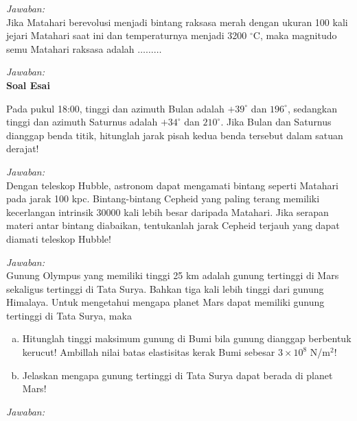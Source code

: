 \documentclass[11pt,fleqn, a4paper]{exam}
\begin{document}
\begin{questions}
\textit{Jawaban: }\\


\vspace{0.5cm}
\question Jika Matahari berevolusi menjadi bintang raksasa merah dengan ukuran 100 kali jejari Matahari saat ini dan temperaturnya menjadi 3200 $^{\circ}$C, maka magnitudo semu Matahari raksasa adalah $\ldots\ldots\ldots$

\textit{Jawaban: }\\


\vspace{1cm}
\textbf{Soal Esai}

\vspace{0.5cm}
\question Pada pukul 18:00, tinggi dan azimuth Bulan adalah $+39^{\circ}$ dan $196^{\circ}$, sedangkan tinggi dan azimuth Saturnus adalah $+34^{\circ}$ dan $210^{\circ}$. Jika Bulan dan Saturnus dianggap benda titik, hitunglah jarak pisah kedua benda tersebut dalam satuan derajat!  

\textit{Jawaban: }\\


\vspace{0.5cm}
\question Dengan teleskop Hubble, astronom dapat mengamati bintang seperti Matahari pada jarak 100 kpc. Bintang-bintang Cepheid yang paling terang memiliki kecerlangan intrinsik 30000 kali lebih besar daripada Matahari. Jika serapan materi antar bintang diabaikan, tentukanlah jarak Cepheid terjauh yang dapat diamati teleskop Hubble!

\textit{Jawaban: }\\


\vspace{0.5cm}
\question Gunung Olympus yang memiliki tinggi 25 km adalah gunung tertinggi di Mars sekaligus tertinggi di Tata Surya. Bahkan tiga kali lebih tinggi dari gunung Himalaya. Untuk mengetahui mengapa planet Mars dapat memiliki gunung tertinggi di Tata Surya, maka
\begin{enumerate}[(a)]
\item Hitunglah tinggi maksimum gunung di Bumi bila gunung dianggap berbentuk kerucut! Ambillah nilai batas elastisitas kerak Bumi sebesar $3 \times 10^8$ N/m$^{2}$!
\item Jelaskan mengapa gunung tertinggi di Tata Surya dapat berada di planet Mars!
\end{enumerate} 

\textit{Jawaban: }\\



\end{questions}
\end{document}
